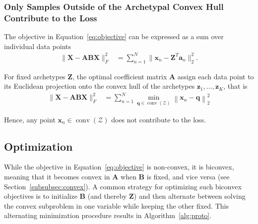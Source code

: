 \documentclass[oneside]{article}
\begin{document}
\subsubsection{Only Samples Outside of the Archetypal Convex Hull Contribute to the Loss}
\label{subsubsec:alternative_aa_formulation}

The objective in Equation~\ref{eq:objective} can be expressed as a sum over individual data points
\begin{equation}
    \begin{aligned}
    \| \mathbf{X} - \mathbf{A} \mathbf{B} \mathbf{X} \|_F^2
    &= \sum_{n=1}^N \| \mathbf{x}_n - \mathbf{Z}^T \mathbf{a}_n \|_2^2.
    \end{aligned}
\end{equation}

For fixed archetypes $\mathbf{Z}$, the optimal coefficient matrix $\mathbf{A}$ assign each data point to its Euclidean projection onto the convex hull of the archetypes $\mathbf{z}_1, ..., \mathbf{z}_K$, that is
\begin{equation}
    \begin{aligned}
    \| \mathbf{X} - \mathbf{A} \mathbf{B} \mathbf{X} \|_F^2
    &= \sum_{n=1}^N \min_{\mathbf{q} \in \operatorname{conv}(\mathcal{Z})} \left\| \mathbf{x}_n - \mathbf{q} \right\|_2^2
    \end{aligned}
\end{equation}

Hence, any point $\mathbf{x}_n \in \operatorname{conv}(\mathcal{Z})$ does not contribute to the loss.

\subsection{Optimization}

While the objective in Equation~\ref{eq:objective} is non-convex, it is biconvex, meaning that it becomes convex in $\mathbf{A}$ when $\mathbf{B}$ is fixed, and vice versa (see Section~\ref{subsubsec:convex}). A common strategy for optimizing such biconvex objectives is to initialize $\mathbf{B}$ (and thereby $\mathbf{Z}$) and then alternate between solving the convex subproblem in one variable while keeping the other fixed. This alternating minimization procedure results in Algorithm~\ref{alg:proto}.
\end{document}
